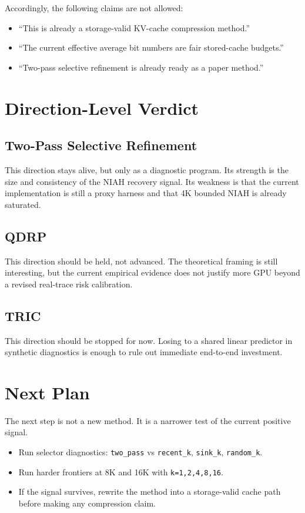 \documentclass[11pt]{article}
\begin{document}
Accordingly, the following claims are not allowed:
\begin{itemize}[leftmargin=1.5em]
\item ``This is already a storage-valid KV-cache compression method.''
\item ``The current effective average bit numbers are fair stored-cache budgets.''
\item ``Two-pass selective refinement is already ready as a paper method.''
\end{itemize}

\section{Direction-Level Verdict}

\subsection{Two-Pass Selective Refinement}

This direction stays alive, but only as a diagnostic program. Its strength is the size and consistency of the NIAH recovery signal. Its weakness is that the current implementation is still a proxy harness and that 4K bounded NIAH is already saturated.

\subsection{QDRP}

This direction should be held, not advanced. The theoretical framing is still interesting, but the current empirical evidence does not justify more GPU beyond a revised real-trace risk calibration.

\subsection{TRIC}

This direction should be stopped for now. Losing to a shared linear predictor in synthetic diagnostics is enough to rule out immediate end-to-end investment.

\section{Next Plan}

The next step is not a new method. It is a narrower test of the current positive signal.

\begin{itemize}[leftmargin=1.5em]
\item Run selector diagnostics: \texttt{two\_pass} vs \texttt{recent\_k}, \texttt{sink\_k}, \texttt{random\_k}.
\item Run harder frontiers at 8K and 16K with \texttt{k=1,2,4,8,16}.
\item If the signal survives, rewrite the method into a storage-valid cache path before making any compression claim.
\end{itemize}
\end{document}
